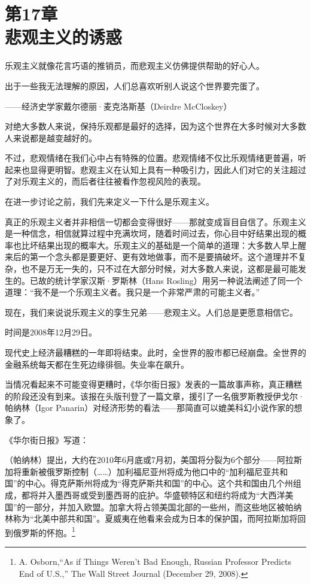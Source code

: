 
\section[第17章\q 悲观主义的诱惑]{第17章\\ 悲观主义的诱惑}

{\kaishu

乐观主义就像花言巧语的推销员，而悲观主义仿佛提供帮助的好心人。

出于一些我无法理解的原因，人们总喜欢听别人说这个世界要完蛋了。

\hfill ——经济史学家戴尔德丽·麦克洛斯基（Deirdre McCloskey）

}

对绝大多数人来说，保持乐观都是最好的选择，因为这个世界在大多时候对大多数人来说都是越变越好的。

不过，悲观情绪在我们心中占有特殊的位置。悲观情绪不仅比乐观情绪更普遍，听起来也显得更明智。悲观主义在认知上具有一种吸引力，因此人们对它的关注超过了对乐观主义的，而后者往往被看作忽视风险的表现。

在进一步讨论之前，我们先来定义一下什么是乐观主义。

真正的乐观主义者并非相信一切都会变得很好——那就变成盲目自信了。乐观主义是一种信念，相信就算过程中充满坎坷，随着时间过去，你心目中好结果出现的概率也比坏结果出现的概率大。乐观主义的基础是一个简单的道理：大多数人早上醒来后的第一个念头都是要更好、更有效地做事，而不是要搞破坏。这个道理并不复杂，也不是万无一失的，只不过在大部分时候，对大多数人来说，这都是最可能发生的。已故的统计学家汉斯·罗斯林（Hans Rosling）用另一种说法阐述了同一个道理：“我不是一个乐观主义者。我只是一个非常严肃的可能主义者。”

现在，我们来说说乐观主义的孪生兄弟——悲观主义。人们总是更愿意相信它。

时间是2008年12月29日。

现代史上经济最糟糕的一年即将结束。此时，全世界的股市都已经崩盘。全世界的金融系统每天都在生死边缘徘徊。失业率在飙升。

当情况看起来不可能变得更糟时，《华尔街日报》发表的一篇故事声称，真正糟糕的阶段还没有到来。该报在头版刊登了一篇文章，援引了一名俄罗斯教授伊戈尔·帕纳林（Igor Panarin）对经济形势的看法——那简直可以媲美科幻小说作家的想象了。

《华尔街日报》写道：

{\kaishu

（帕纳林）提出，大约在2010年6月底或7月初，美国将分裂为6个部分——阿拉斯加将重新被俄罗斯控制（……）加利福尼亚州将成为他口中的“加利福尼亚共和国”的中心。得克萨斯州将成为“得克萨斯共和国”的中心。这个共和国由几个州组成，都将并入墨西哥或受到墨西哥的庇护。华盛顿特区和纽约将成为“大西洋美国”的一部分，并加入欧盟。加拿大将占领美国北部的一些州，而这些地区被帕纳林称为“北美中部共和国”。夏威夷在他看来会成为日本的保护国，而阿拉斯加将回到俄罗斯的怀抱。\footnote{A. Osborn,“As if Things Weren’t Bad Enough, Russian Professor Predicts End of U.S.,” The Wall Street Journal (December 29, 2008).}

}

